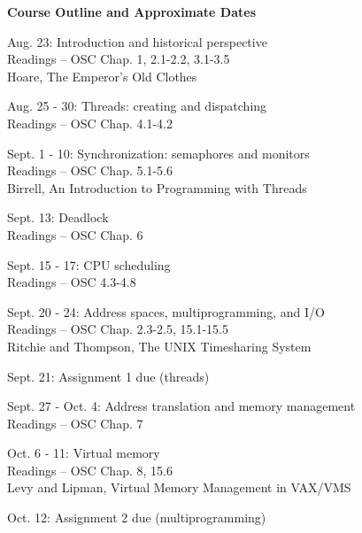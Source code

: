 \begin{center}
{\large {\bf Course Outline and Approximate Dates}}
\end{center}

\begin{description}

\item{Aug. 23:} Introduction and historical perspective\\
  Readings -- OSC Chap. 1, 2.1-2.2, 3.1-3.5\\
  Hoare, The Emperor's Old Clothes

\item{Aug. 25 - 30:} Threads: creating and dispatching\\
  Readings -- OSC Chap. 4.1-4.2

\item{Sept. 1 - 10:} Synchronization: semaphores and monitors\\
  Readings -- OSC Chap. 5.1-5.6\\
  Birrell, An Introduction to Programming with Threads

\item{Sept. 13:} Deadlock\\
  Readings -- OSC Chap. 6

\item{Sept. 15 - 17:} CPU scheduling\\
  Readings -- OSC 4.3-4.8

\item{Sept. 20 - 24:} Address spaces, multiprogramming, and I/O\\
  Readings -- OSC Chap. 2.3-2.5, 15.1-15.5\\
  Ritchie and Thompson, The UNIX Timesharing System

\item{Sept. 21:} Assignment 1 due (threads)

\item{Sept. 27 - Oct. 4:} Address translation and memory management\\
  Readings -- OSC Chap. 7

\item{Oct. 6 - 11:} Virtual memory\\
  Readings -- OSC Chap. 8, 15.6\\
  Levy and Lipman, Virtual Memory Management in VAX/VMS

\item{Oct. 12:} Assignment 2 due (multiprogramming)


\end{description}
